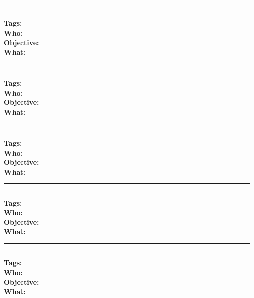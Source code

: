 \documentclass[11pt,a4paper]{article}
\begin{document}
\noindent\rule{\textwidth}{1pt}
\subsection*{\bibentry{}}
\textbf{Tags:}  \\
\textbf{Who:}  \\
\textbf{Objective:}  \\
\textbf{What:} 

\noindent\rule{\textwidth}{1pt}
\subsection*{\bibentry{}}
\textbf{Tags:}  \\
\textbf{Who:}  \\
\textbf{Objective:}  \\
\textbf{What:} 

\noindent\rule{\textwidth}{1pt}
\subsection*{\bibentry{}}
\textbf{Tags:}  \\
\textbf{Who:}  \\
\textbf{Objective:}  \\
\textbf{What:} 

\noindent\rule{\textwidth}{1pt}
\subsection*{\bibentry{}}
\textbf{Tags:}  \\
\textbf{Who:}  \\
\textbf{Objective:}  \\
\textbf{What:} 

\noindent\rule{\textwidth}{1pt}
\subsection*{\bibentry{}}
\textbf{Tags:}  \\
\textbf{Who:}  \\
\textbf{Objective:}  \\
\textbf{What:} 



\end{document}
